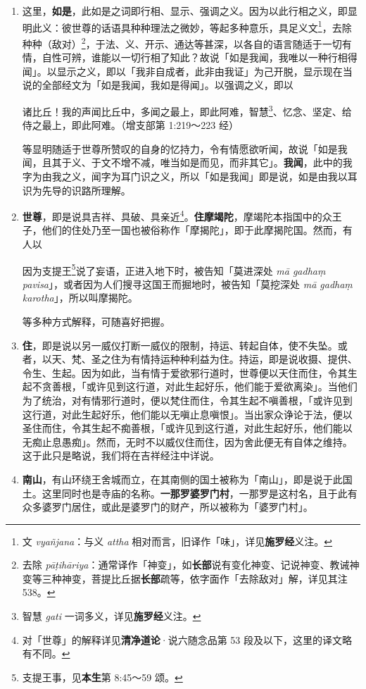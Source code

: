 \begin{enumerate}
\item 这里，\textbf{如是}，此如是之词即行相、显示、强调之义。因为以此行相之义，即显明此义：彼世尊的话语具种种理法之微妙，等起多种意乐，具足义文\footnote{文 \textit{vyañjana}：与义 \textit{attha} 相对而言，旧译作「味」，详见\textbf{施罗经}义注。}，去除种种（敌对）\footnote{去除 \textit{pāṭihāriya}：通常译作「神变」，如\textbf{长部}说有变化神变、记说神变、教诫神变等三种神变，菩提比丘据\textbf{长部}疏等，依字面作「去除敌对」解，详见其注 538。}，于法、义、开示、通达等甚深，以各自的语言随适于一切有情，自性可辨，谁能以一切行相了知此？故说「如是我闻，我唯以一种行相得闻」。以显示之义，即以「我非自成者，此非由我证」为己开脱，显示现在当说的全部经文为「如是我闻，我如是得闻」。以强调之义，即以\begin{quoting}诸比丘！我的声闻比丘中，多闻之最上，即此阿难，智慧\footnote{智慧 \textit{gati} 一词多义，详见\textbf{施罗经}义注。}、忆念、坚定、给侍之最上，即此阿难。（增支部第 1:219～223 经）\end{quoting}等显明随适于世尊所赞叹的自身的忆持力，令有情愿欲听闻，故说「如是我闻，且其于义、于文不增不减，唯当如是而见，而非其它」。\textbf{我闻}，此中的我字为由我之义，闻字为耳门识之义，所以「如是我闻」即是说，如是由我以耳识为先导的识路所理解。
\item \textbf{世尊}，即是说具吉祥、具破、具亲近\footnote{对「世尊」的解释详见\textbf{清净道论}·说六随念品第 53 段及以下，这里的译文略有不同。}。\textbf{住摩竭陀}，摩竭陀本指国中的众王子，他们的住处乃至一国也被俗称作「摩揭陀」，即于此摩揭陀国。然而，有人以\begin{quoting}因为支提王\footnote{支提王事，见\textbf{本生}第 8:45～59 颂。}说了妄语，正进入地下时，被告知「莫进深处 \textit{mā gadhaṃ pavisa}」，或者因为人们搜寻这国王而掘地时，被告知「莫挖深处 \textit{mā gadhaṃ karotha}」，所以叫摩揭陀。\end{quoting}等多种方式解释，可随喜好把握。
\item \textbf{住}，即是说以另一威仪打断一威仪的限制，持运、转起自体，使不失坠。或者，以天、梵、圣之住为有情持运种种利益为住。持运，即是说收摄、提供、令生、生起。因为如此，当有情于爱欲邪行道时，世尊便以天住而住，令其生起不贪善根，「或许见到这行道，对此生起好乐，他们能于爱欲离染」。当他们为了统治，对有情邪行道时，便以梵住而住，令其生起不嗔善根，「或许见到这行道，对此生起好乐，他们能以无嗔止息嗔恨」。当出家众诤论于法，便以圣住而住，令其生起不痴善根，「或许见到这行道，对此生起好乐，他们能以无痴止息愚痴」。然而，无时不以威仪住而住，因为舍此便无有自体之维持。这于此只是略说，我们将在吉祥经注中详说。
\item \textbf{南山}，有山环绕王舍城而立，在其南侧的国土被称为「南山」，即是说于此国土。这里同时也是寺庙的名称。\textbf{一那罗婆罗门村}，一那罗是这村名，且于此有众多婆罗门居住，或此是婆罗门的财产，所以被称为「婆罗门村」。\end{enumerate}


